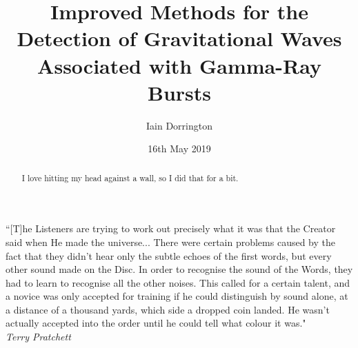 \documentclass[11pt]{cuthesis}
\title{Improved Methods for the Detection of Gravitational Waves Associated with Gamma-Ray Bursts}
\author{Iain Dorrington}
\date{16th May 2019}
\begin{document}

\maketitle

\frontmatter

\begin{abstract}
    I love hitting my head against a wall, so I did that for a bit.
\end{abstract}

\declaration

\tableofcontents
\listoffigures
\listoftables

\begin{dedication}
    ``[T]he Listeners are trying to work out precisely what it was that the Creator said when He made the universe...  There were certain problems caused by the fact that they didn't hear only the subtle echoes of the first words, but every other sound made on the Disc. In order to recognise the sound of the Words, they had to learn to recognise all the other noises. This called for a certain talent, and a novice was only accepted for training if he could distinguish by sound alone, at a distance of a thousand yards, which side a dropped coin landed. He wasn't actually accepted into the order until he could tell what colour it was."\\
    \vspace{1cm}
    \hfill \textit{Terry Pratchett}
\end{dedication}


\mainmatter
\end{document}
